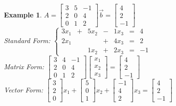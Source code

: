 \documentclass[a4paper,12pt]{book}
\theoremstyle{defn}
\theoremstyle{expl}
\newtheorem{expl}{Example}[section]
\begin{document}
\begin{expl}
\textup{
$A = \left[\begin{array}{ccc}3&5&-1\\2&0&4\\0&1&2\end{array}\right] \vec{b}=\left[\begin{array}{c}4\\2\\-1\end{array}\right]$\\
Standard Form: $\left\{\begin{array}{ccccccc}
3x_1&+&5x_2&-&1x_3&=&4\\
2x_1&&&+&4x_3&=&2\\
&&1x_2&+&2x_3&=&-1
\end{array}
 \right.$\\
Matrix Form: $\left[\begin{array}{ccc}3&4&-1\\2&0&4\\0&1&2\end{array} \right]\left[\begin{array}{c}x_1\\x_2\\x_3\end{array} \right] = \left[\begin{array}{c}4\\2\\-1\end{array} \right]$\\
Vector Form: $\left[\begin{array}{c}3\\2\\0\end{array}\right]x_1+\left[\begin{array}{c}5\\0\\1\end{array}\right]x_2+\left[\begin{array}{c}-1\\4\\2\end{array}\right]x_3=\left[\begin{array}{c}4\\2\\-1\end{array}\right]$
}\end{expl}
\end{document}
